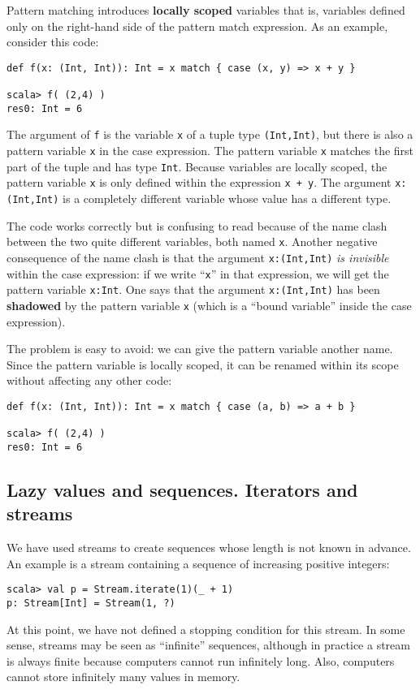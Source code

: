 Pattern matching introduces \textbf{locally scoped}
variables \textemdash{} that is, variables defined only on the right-hand
side of the pattern match expression. As an example, consider this
code:
\begin{lstlisting}
def f(x: (Int, Int)): Int = x match { case (x, y) => x + y }

scala> f( (2,4) )
res0: Int = 6
\end{lstlisting}
The argument of \lstinline!f! is the variable \lstinline!x! of a
tuple type \lstinline!(Int,Int)!, but there is also a pattern variable
\lstinline!x! in the case expression. The pattern variable \lstinline!x!
matches the first part of the tuple and has type \lstinline!Int!.
Because variables are locally scoped, the pattern variable \lstinline!x!
is only defined within the expression \lstinline!x + y!. The argument
\lstinline!x:(Int,Int)! is a completely different variable whose
value has a different type.

The code works correctly but is confusing to read because of the name
clash between the two quite different variables, both named \lstinline!x!.
Another negative consequence of the name clash is that the argument
\lstinline!x:(Int,Int)! \emph{is invisible} within the case expression:
if we write \textsf{``}\lstinline!x!\textsf{''} in that expression, we will get the
pattern variable \lstinline!x:Int!. One says that the argument \lstinline!x:(Int,Int)!
has been \textbf{shadowed} by the pattern variable
\lstinline!x! (which is a \textsf{``}bound variable\textsf{''}
inside the case expression).

The problem is easy to avoid: we can give the pattern variable another
name. Since the pattern variable is locally scoped, it can be renamed
within its scope without affecting any other code:
\begin{lstlisting}
def f(x: (Int, Int)): Int = x match { case (a, b) => a + b }

scala> f( (2,4) )
res0: Int = 6
\end{lstlisting}


\subsection{Lazy values and sequences. Iterators and streams\label{subsec:Lazy-values-iterators-and-streams}}

We have used streams to create sequences whose length is not known
in advance. An example is a stream containing a sequence of increasing
positive integers:
\begin{lstlisting}
scala> val p = Stream.iterate(1)(_ + 1)
p: Stream[Int] = Stream(1, ?)
\end{lstlisting}
At this point, we have not defined a stopping condition for this stream.
In some sense, streams may be seen as \textsf{``}infinite\textsf{''} sequences, although
in practice a stream is always finite because computers cannot run
infinitely long. Also, computers cannot store infinitely many values
in memory. 

